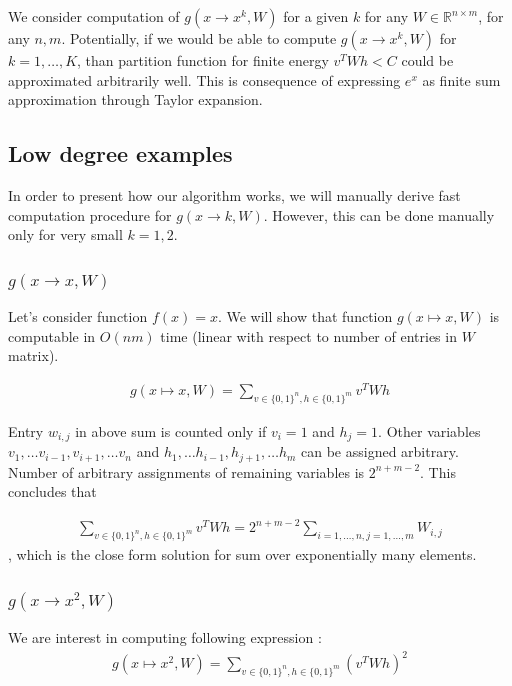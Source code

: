 \documentclass{article}
\begin{document}
We consider computation of $g(x \rightarrow x^k, W)$ for a given $k$ for any $W
\in \mathbb{R}^{n \times m}$, for any $n, m$. Potentially, if we would be able
to compute $g(x \rightarrow x^k, W)$ for $k = 1, \dots, K$, than partition
function for finite energy $v^TWh < C$ could be approximated arbitrarily well.
This is consequence of expressing $e^{x}$ as finite sum approximation through
Taylor expansion.

\subsection{Low degree examples} In order to present how our algorithm works,
we will manually derive fast computation procedure for $g(x \rightarrow k, W)$.
However, this can be done manually only for very small $k = 1, 2$. 


\subsubsection{$g(x \rightarrow x, W)$} Let's consider function $f(x) = x$. We
will show that function $g(x \mapsto x, W)$ is computable in $O(nm)$ time
(linear with respect to number of entries in $W$ matrix).
 
\begin{gather*}
	g(x \mapsto x, W) = \sum_{v \in \{0, 1\}^n, h \in \{0, 1\}^m} v^TWh
\end{gather*}

Entry $w_{i,j}$ in above sum is counted only if $v_i = 1$ and $h_j = 1$. Other variables
$v_1, \dots v_{i-1}, v_{i+1}, \dots v_n$ and $h_1, \dots h_{i-1}, h_{j+1}, \dots h_m$ can be 
assigned arbitrary. Number of arbitrary assignments of remaining variables is $2^{n + m - 2}$. 
This concludes that 

\begin{gather*}
	\sum_{v \in \{0, 1\}^n, h \in \{0, 1\}^m} v^TWh = 2^{n + m - 2}\sum_{i = 1, \dots, n, j = 1, \dots, m} W_{i, j}
\end{gather*}
, which is the close form solution for sum over exponentially many elements.

\subsubsection{$g(x \rightarrow x^2, W)$}

We are interest in computing following expression : 
\begin{gather*}
	g(x \mapsto x^2, W) = \sum_{v \in \{0, 1\}^n, h \in \{0, 1\}^m} (v^TWh)^2
\end{gather*}
\end{document}
